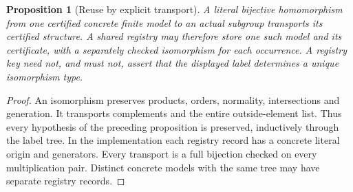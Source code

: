 \documentclass[10pt]{article}
\newtheorem{proposition}{Proposition}
\begin{document}
\begin{proposition}[Reuse by explicit transport]
A literal bijective homomorphism from one certified concrete finite model
to an actual subgroup transports its certified structure. A shared registry
may therefore store one such model and its certificate, with a separately
checked isomorphism for each occurrence. A registry key need not, and must
not, assert that the displayed label determines a unique isomorphism type.
\end{proposition}
\begin{proof}
An isomorphism preserves products, orders, normality, intersections and
generation. It transports complements and the entire outside-element list.
Thus every hypothesis of the preceding proposition is preserved, inductively
through the label tree. In the implementation each registry record has a
concrete literal origin and generators. Every transport is a full bijection
checked on every multiplication pair. Distinct concrete models with the same
tree may have separate registry records.
\end{proof}
\end{document}
